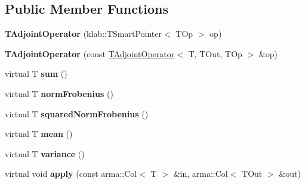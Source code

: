\subsection*{Public Member Functions}
\begin{DoxyCompactItemize}
\item 
{\bfseries T\+Adjoint\+Operator} (klab\+::\+T\+Smart\+Pointer$<$ T\+Op $>$ op)\hypertarget{classkl1p_1_1TAdjointOperator_a8e918c720c43916849e3b8e7c7d651ad}{}\label{classkl1p_1_1TAdjointOperator_a8e918c720c43916849e3b8e7c7d651ad}

\item 
{\bfseries T\+Adjoint\+Operator} (const \hyperlink{classkl1p_1_1TAdjointOperator}{T\+Adjoint\+Operator}$<$ T, T\+Out, T\+Op $>$ \&op)\hypertarget{classkl1p_1_1TAdjointOperator_ac91c13b95d8cf024186ad2339f37a9bd}{}\label{classkl1p_1_1TAdjointOperator_ac91c13b95d8cf024186ad2339f37a9bd}

\item 
virtual T {\bfseries sum} ()\hypertarget{classkl1p_1_1TAdjointOperator_a02576547b1785c3e26074fb1b1466034}{}\label{classkl1p_1_1TAdjointOperator_a02576547b1785c3e26074fb1b1466034}

\item 
virtual T {\bfseries norm\+Frobenius} ()\hypertarget{classkl1p_1_1TAdjointOperator_a6b11f3ed65e7b5a3efb84392a0bf3469}{}\label{classkl1p_1_1TAdjointOperator_a6b11f3ed65e7b5a3efb84392a0bf3469}

\item 
virtual T {\bfseries squared\+Norm\+Frobenius} ()\hypertarget{classkl1p_1_1TAdjointOperator_a6b539d6725fde5e6106e73a52377dc6f}{}\label{classkl1p_1_1TAdjointOperator_a6b539d6725fde5e6106e73a52377dc6f}

\item 
virtual T {\bfseries mean} ()\hypertarget{classkl1p_1_1TAdjointOperator_a3a01f76abe52501b9567e72bf3b9c1cc}{}\label{classkl1p_1_1TAdjointOperator_a3a01f76abe52501b9567e72bf3b9c1cc}

\item 
virtual T {\bfseries variance} ()\hypertarget{classkl1p_1_1TAdjointOperator_a38ef44746cc7c4d1368f7916fb3033ca}{}\label{classkl1p_1_1TAdjointOperator_a38ef44746cc7c4d1368f7916fb3033ca}

\item 
virtual void {\bfseries apply} (const arma\+::\+Col$<$ T $>$ \&in, arma\+::\+Col$<$ T\+Out $>$ \&out)\hypertarget{classkl1p_1_1TAdjointOperator_a0b1d3c2b9364cfe1b3625096c203c651}{}\label{classkl1p_1_1TAdjointOperator_a0b1d3c2b9364cfe1b3625096c203c651}


\end{DoxyCompactItemize}
